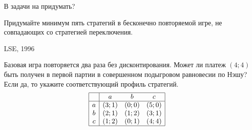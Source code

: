 \begin{problem}{\red В задачи на придумать? }

Придумайте минимум пять стратегий в бесконечно повторяемой игре, не совпадающих со стратегией переключения.



\begin{sol}

\end{sol}
\end{problem}



\begin{problem}
\begin{source}
LSE, 1996
\end{source}
Базовая игра повторяется два раза без дисконтирования. Может ли платеж  $\left(4;4\right)$  быть получен в первой партии в совершенном подыгровом равновесии по Нэшу? Если да, то укажите соответствующий профиль стратегий.
\[\begin{array}{|c|ccc|}  \hline {} & {a} & {b} & {c} \\  \hline {a} & {\left(3;1\right)} & {\left(0;0\right)} & {\left(5;0\right)} \\ {b} & {\left(2;1\right)} & {\left(1;2\right)} & {\left(3;1\right)} \\ {c} & {\left(1;2\right)} & {\left(0;1\right)} & {\left(4;4\right)} \\  \hline  \end{array}\]



\begin{sol}

\end{sol}
\end{problem}



